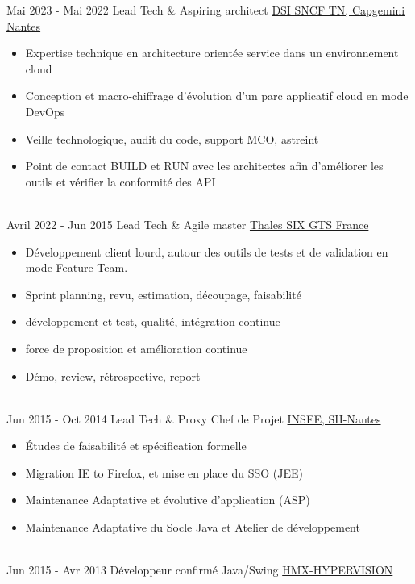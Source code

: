 \documentclass[letterpaper]{twentysecondcv} %
\begin{document}
\begin{twenty}
		\twentyitem
		{Mai 2023 -}
		{Mai 2022}
		{Lead Tech \& Aspiring architect}
		{\href{https://www.transilien.com/fr}{DSI SNCF TN, Capgemini Nantes}}
		{}
		{\begin{itemize}	
				\item Expertise technique en architecture orientée service dans un environnement cloud
				\item Conception et macro-chiffrage d'évolution d'un parc applicatif cloud en mode DevOps
				\item Veille technologique, audit du code, support MCO, astreint
				\item Point de contact BUILD et RUN avec les architectes afin d'améliorer les outils et vérifier la conformité des API
		\end{itemize}}
		\\
		\twentyitem
		{Avril 2022 -}
		{Jun 2015}
		{Lead Tech \& Agile master}
		{\href{https://www.thalesgroup.com/fr}{Thales SIX GTS France}}
		{}
		{\begin{itemize} 		
				\item Développement client lourd, autour des outils de tests et de validation en mode Feature Team.
				\item Sprint planning, revu, estimation, découpage, faisabilité
				\item développement et test, qualité, intégration continue
				\item force de proposition et amélioration continue
				\item Démo, review, rétrospective, report
		\end{itemize}}
		\\
		\twentyitem    	
		{Jun 2015 -}
		{Oct 2014}
		{Lead Tech \& Proxy Chef de Projet}
		{\href{https://www.insee.fr/fr/accueil}{INSEE, SII-Nantes}}
		{}
		{
			{\begin{itemize}
					\item Études de faisabilité et spécification formelle
					\item Migration IE to Firefox, et mise en place du SSO (JEE)
					\item Maintenance Adaptative et évolutive d'application (ASP)
					\item Maintenance Adaptative du Socle Java et Atelier de développement
			\end{itemize}}
		}
		\\
		\twentyitem   		
		{Jun 2015 -}
		{Avr 2013}
		{Développeur confirmé Java/Swing}
		{\href{}{HMX-HYPERVISION}}
		{}
		{
			\begin{itemize}

\end{itemize}}
\end{twenty}
\end{document}

